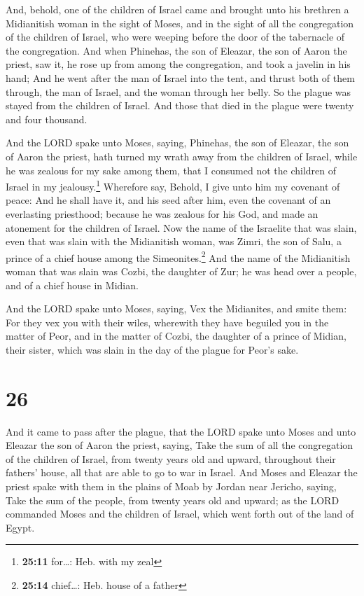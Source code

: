  And, behold, one of the children of Israel came and
brought unto his brethren a Midianitish woman in the sight of Moses, and
in the sight of all the congregation of the children of Israel, who were
weeping before the door of the tabernacle of the congregation.
 And when Phinehas, the son of Eleazar, the son of Aaron
the priest, saw it, he rose up from among the congregation, and took a
javelin in his hand;  And he went after the man of Israel
into the tent, and thrust both of them through, the man of Israel, and
the woman through her belly. So the plague was stayed from the children
of Israel.  And those that died in the plague were twenty
and four thousand.

 And the LORD spake unto Moses, saying, 
Phinehas, the son of Eleazar, the son of Aaron the priest, hath turned
my wrath away from the children of Israel, while he was zealous for my
sake among them, that I consumed not the children of Israel in my
jealousy.\footnote{\textbf{25:11} for\ldots: Heb. with my zeal}
 Wherefore say, Behold, I give unto him my covenant of
peace:  And he shall have it, and his seed after him,
even the covenant of an everlasting priesthood; because he was zealous
for his God, and made an atonement for the children of Israel.
 Now the name of the Israelite that was slain, even that
was slain with the Midianitish woman, was Zimri, the son of Salu, a
prince of a chief house among the Simeonites.\footnote{\textbf{25:14}
  chief\ldots: Heb. house of a father}  And the name of
the Midianitish woman that was slain was Cozbi, the daughter of Zur; he
was head over a people, and of a chief house in Midian.

 And the LORD spake unto Moses, saying, 
Vex the Midianites, and smite them:  For they vex you
with their wiles, wherewith they have beguiled you in the matter of
Peor, and in the matter of Cozbi, the daughter of a prince of Midian,
their sister, which was slain in the day of the plague for Peor's sake.

\hypertarget{section-25}{%
\section{26}\label{section-25}}

 And it came to pass after the plague, that the LORD spake
unto Moses and unto Eleazar the son of Aaron the priest, saying,
 Take the sum of all the congregation of the children of
Israel, from twenty years old and upward, throughout their fathers'
house, all that are able to go to war in Israel.  And
Moses and Eleazar the priest spake with them in the plains of Moab by
Jordan near Jericho, saying,  Take the sum of the people,
from twenty years old and upward; as the LORD commanded Moses and the
children of Israel, which went forth out of the land of Egypt.

